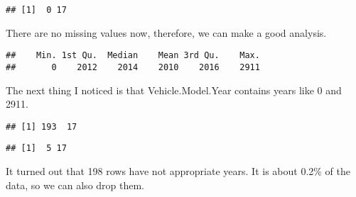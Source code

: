 \documentclass[
]{article}
\newenvironment{Shaded}{\begin{snugshade}}{\end{snugshade}}
\newcommand{\DecValTok}[1]{\textcolor[rgb]{0.00,0.00,0.81}{#1}}
\newcommand{\FunctionTok}[1]{\textcolor[rgb]{0.13,0.29,0.53}{\textbf{#1}}}
\newcommand{\NormalTok}[1]{#1}
\newcommand{\OtherTok}[1]{\textcolor[rgb]{0.56,0.35,0.01}{#1}}
\newcommand{\SpecialCharTok}[1]{\textcolor[rgb]{0.81,0.36,0.00}{\textbf{#1}}}
\newcommand{\StringTok}[1]{\textcolor[rgb]{0.31,0.60,0.02}{#1}}
\begin{document}
\begin{verbatim}
## [1]  0 17
\end{verbatim}

There are no missing values now, therefore, we can make a good analysis.

\begin{Shaded}
\end{Shaded}

\begin{verbatim}
##    Min. 1st Qu.  Median    Mean 3rd Qu.    Max. 
##       0    2012    2014    2010    2016    2911
\end{verbatim}

The next thing I noticed is that Vehicle.Model.Year contains years like
0 and 2911.

\begin{Shaded}
\end{Shaded}

\begin{verbatim}
## [1] 193  17
\end{verbatim}

\begin{Shaded}
\end{Shaded}

\begin{verbatim}
## [1]  5 17
\end{verbatim}

It turned out that 198 rows have not appropriate years. It is about
0.2\% of the data, so we can also drop them.

\begin{Shaded}
\end{Shaded}
\end{document}
